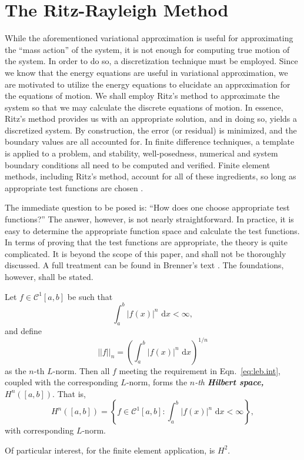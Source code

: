 \section{The Ritz-Rayleigh Method}
While the aforementioned variational approximation is useful for approximating the ``mass action'' of the system, it is not enough for computing true motion of the system. In order to do so, a discretization technique must be employed. Since we know that the energy equations are useful in variational approximation, we are motivated to utilize the energy equations to elucidate an approximation for the equations of motion. We shall employ Ritz's method to approximate the system so that we may calculate the discrete equations of motion. In essence, Ritz's method provides us with an appropriate solution, and in doing so, yields a discretized system. By construction, the error (or residual) is minimized, and the boundary values are all accounted for. In finite difference techniques, a template is applied to a problem, and stability, well-posedness, numerical and system boundary conditions all need to be computed and verified. Finite element methods, including Ritz's method, account for all of these ingredients, so long as appropriate test functions are chosen \cite{axelsson1984finite}.

The immediate question to be posed is: ``How does one choose appropriate test functions?'' The answer, however, is not nearly straightforward. In practice, it is easy to determine the appropriate function space and calculate the test functions. In terms of proving that the test functions are appropriate, the theory is quite complicated. It is beyond the scope of this paper, and shall not be thoroughly discussed. A full treatment can be found in Brenner's text \cite{brenner2008mathematical}. The foundations, however, shall be stated.

\begin{definition}
Let $f\in\mathcal C^1[a,b]$ be such that
\begin{equation}
\int_a^b\left|f(x)\right|^n\text{ d}x<\infty,
\label{eq:leb.int}
\end{equation}
and define
\begin{equation}
||f||_{n} = \left(\int_a^b\left|f(x)\right|^n\text{ d}x\right)^{1/n}
\end{equation}
as the $n$-th $L$-norm. Then all $f$ meeting the requirement in Eqn.~\ref{eq:leb.int}, coupled with the corresponding $L$-norm, forms the \emph{$n$-th \textbf{Hilbert space, $H^n([a,b])$}}. That is, 
\begin{equation}
H^n([a,b]) = \left\{f\in\mathcal C^1[a,b]:\int_a^b\left|f(x)\right|^n\text{ d}x<\infty\right\},
\end{equation}
with corresponding $L$-norm. 
\end{definition}
Of particular interest, for the finite element application, is $H^2$.

